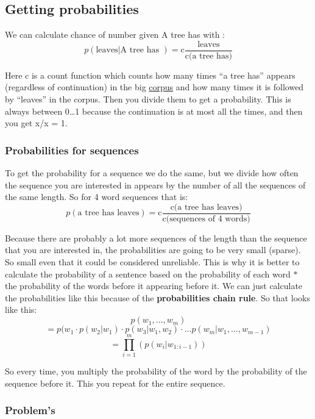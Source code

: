 \documentclass[
  11pt,
  british,
]{article}
\begin{document}
\hypertarget{getting-probabilities}{%
\subsection{Getting probabilities}\label{getting-probabilities}}

We can calculate chance of number given A tree has with :
\[p(\text{leaves}|\text{A tree has }) = \text{c}\frac{\text{leaves}}{\text{c(a tree has)}}\]

Here c is a count function which counts how many times ``a tree has''
appears (regardless of continuation) in the big
\href{../Data/Corpus.md}{corpus} and how many times it is followed by
``leaves'' in the corpus. Then you divide them to get a probability.
This is always between 0\ldots1 because the continuation is at most all
the times, and then you get x/x = 1.

\hypertarget{probabilities-for-sequences}{%
\subsubsection{Probabilities for
sequences}\label{probabilities-for-sequences}}

To get the probability for a sequence we do the same, but we divide how
often the sequence you are interested in appears by the number of all
the sequences of the same length. So for 4 word sequences that is:
\[p(\text{a tree has leaves}) = \text{c}\frac{\text{c(a tree has leaves)}}{\text{c(sequences of 4 words)}}\]

Because there are probably a lot more sequences of the length than the
sequence that you are interested in, the probabilities are going to be
very small (sparse). So small even that it could be considered
unreliable. This is why it is better to calculate the probability of a
sentence based on the probability of each word \(*\) the probability of
the words before it appearing before it. We can just calculate the
probabilities like this because of the \textbf{probabilities chain
rule}. So that looks like this: \[p(w_{1},...,w_{m})\]
\[= p(w_{1} \cdot p(w_2|w_{1}) \cdot p(w_3|w_{1},w_{2}) \cdot ... p(w_{m}|w_1,...,w_{m-1})\]
\[=\prod_{{i}=1}^m(p(w_i|w_{1:i-1}))\]

So every time, you multiply the probability of the word by the
probability of the sequence before it. This you repeat for the entire
sequence.

\hypertarget{problems}{%
\subsubsection{Problem's}\label{problems}}
\end{document}

